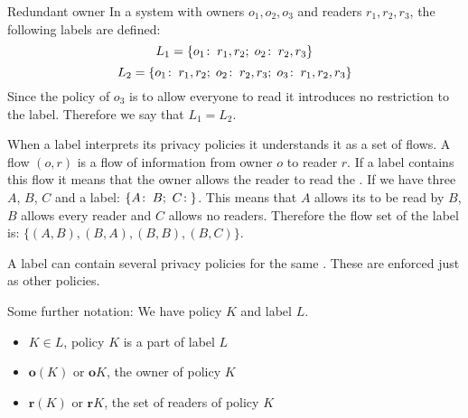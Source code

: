 \begin{example}{Redundant owner}
In a system with owners $o_1, o_2, o_3$ and readers $r_1, r_2, r_3$, the following labels are defined:
$$L_1 = \{o_1\!:\;r_1,r_2;\; o_2\!:\;r_2, r_3\}$$
$$L_2 = \{o_1\!:\;r_1,r_2;\; o_2\!:\;r_2, r_3;\; o_3\!:\;r_1, r_2, r_3\}$$
Since the policy of $o_3$ is to allow everyone to read it introduces no restriction to the label.
Therefore we say that $L_1 = L_2$.
\end{example}

When a label interprets its privacy policies it understands it as a set of flows.
A flow $(o,r)$ is a flow of information from owner $o$ to reader $r$.
If a label contains this flow it means that the owner allows the reader to read the \xvalue{}.
If we have three \principals{} $A$, $B$, $C$ and a label: $\{\policy{A}{B}; \ \policy{C}{}\}$.
This means that $A$ allows its \xvalue{} to be read by $B$, $B$ allows every reader and $C$ allows no readers.
Therefore the flow set of the label is: $\{(A,B), (B,A), (B,B), (B,C) \}$.

A label can contain several privacy policies for the same \principal{}.
These are enforced just as other policies.

Some further notation:
We have policy $K$ and label $L$.
\begin{itemize}
\item $K \in L$, policy $K$ is a part of label $L$
\item $\textbf{o}(K)$ or $\textbf{o}K$, the owner of policy $K$
\item $\textbf{r}(K)$ or $\textbf{r}K$, the set of readers of policy $K$
\end{itemize}

